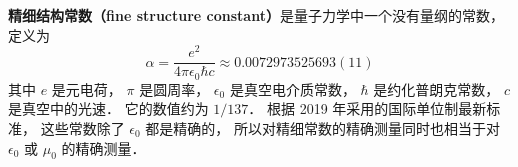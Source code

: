

\textbf{精细结构常数（fine structure constant）}是量子力学中一个没有量纲的常数， 定义为
\begin{equation}\label{FinStr_eq1}
\alpha = \frac{e^2}{4\pi\epsilon_0\hbar c} \approx 0.0072973525693(11)
\end{equation}
其中 $e$ 是元电荷， $\pi$ 是圆周率， $\epsilon_0$ 是真空电介质常数， $\hbar$ 是约化普朗克常数， $c$ 是真空中的光速． 它的数值约为 $1/137$． 根据 2019 年采用的国际单位制最新标准， 这些常数除了 $\epsilon_0$ 都是精确的， 所以对精细常数的精确测量同时也相当于对 $\epsilon_0$ 或 $\mu_0$ 的精确测量．
